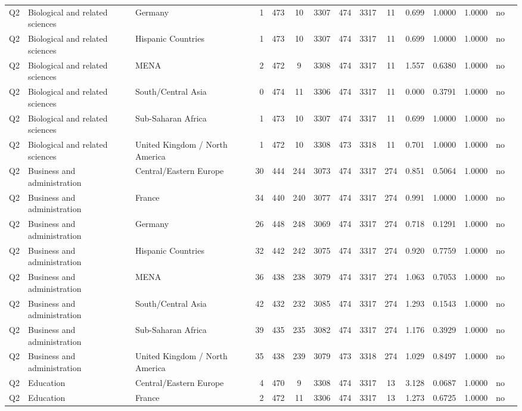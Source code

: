 \begin{longtable}{lllrcccccccccll}
Q2 & Biological and related sciences & Germany & 1 & 473 & 10 & 3307 & 474 & 3317 & 11 & 0.699 & 1.0000 & 1.0000 & no \\
Q2 & Biological and related sciences & Hispanic Countries & 1 & 473 & 10 & 3307 & 474 & 3317 & 11 & 0.699 & 1.0000 & 1.0000 & no \\
Q2 & Biological and related sciences & MENA & 2 & 472 & 9 & 3308 & 474 & 3317 & 11 & 1.557 & 0.6380 & 1.0000 & no \\
Q2 & Biological and related sciences & South/Central Asia & 0 & 474 & 11 & 3306 & 474 & 3317 & 11 & 0.000 & 0.3791 & 1.0000 & no \\
Q2 & Biological and related sciences & Sub-Saharan Africa & 1 & 473 & 10 & 3307 & 474 & 3317 & 11 & 0.699 & 1.0000 & 1.0000 & no \\
Q2 & Biological and related sciences & United Kingdom / North America & 1 & 472 & 10 & 3308 & 473 & 3318 & 11 & 0.701 & 1.0000 & 1.0000 & no \\
Q2 & Business and administration & Central/Eastern Europe & 30 & 444 & 244 & 3073 & 474 & 3317 & 274 & 0.851 & 0.5064 & 1.0000 & no \\
Q2 & Business and administration & France & 34 & 440 & 240 & 3077 & 474 & 3317 & 274 & 0.991 & 1.0000 & 1.0000 & no \\
Q2 & Business and administration & Germany & 26 & 448 & 248 & 3069 & 474 & 3317 & 274 & 0.718 & 0.1291 & 1.0000 & no \\
Q2 & Business and administration & Hispanic Countries & 32 & 442 & 242 & 3075 & 474 & 3317 & 274 & 0.920 & 0.7759 & 1.0000 & no \\
Q2 & Business and administration & MENA & 36 & 438 & 238 & 3079 & 474 & 3317 & 274 & 1.063 & 0.7053 & 1.0000 & no \\
Q2 & Business and administration & South/Central Asia & 42 & 432 & 232 & 3085 & 474 & 3317 & 274 & 1.293 & 0.1543 & 1.0000 & no \\
Q2 & Business and administration & Sub-Saharan Africa & 39 & 435 & 235 & 3082 & 474 & 3317 & 274 & 1.176 & 0.3929 & 1.0000 & no \\
Q2 & Business and administration & United Kingdom / North America & 35 & 438 & 239 & 3079 & 473 & 3318 & 274 & 1.029 & 0.8497 & 1.0000 & no \\
Q2 & Education & Central/Eastern Europe & 4 & 470 & 9 & 3308 & 474 & 3317 & 13 & 3.128 & 0.0687 & 1.0000 & no \\
Q2 & Education & France & 2 & 472 & 11 & 3306 & 474 & 3317 & 13 & 1.273 & 0.6725 & 1.0000 & no \\

\end{longtable}
